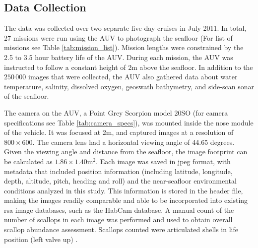 \subsection{Data Collection}

The data was collected over two separate five-day cruises in July 2011.   
In total, 27 missions were run using the AUV to photograph the seafloor (For list of missions see Table \ref{tab:mission_list}).  
Mission lengths were constrained by the 2.5 to 3.5 hour battery life of the AUV.  
During each mission, the AUV was instructed to follow a constant height of 2\;m
above the seafloor.  In addition to the $250\,000$ images that were collected, the 
AUV also gathered data about water temperature, salinity, dissolved oxygen, 
geoswath bathymetry, and side-scan sonar of the seafloor.

The camera on the AUV, a Point Grey Scorpion model 20SO (for camera specifications see Table \ref{tab:camera_specs}), 
was mounted inside the nose module of the vehicle.
It was focused at 2\;m, and captured
images at a resolution of $800\times600$.  The camera lens had a horizontal viewing 
angle of 44.65 degrees.  Given the viewing angle and distance from the seafloor, 
the image footprint can be calculated as $1.86\times1.40$\;m$^2$.
Each image was saved in jpeg format, with metadata that included position information 
(including latitude, longitude, depth, altitude, pitch, heading and roll)  
and the near-seafloor environmental conditions analyzed in this study.  
This information is stored in the header file, making the images readily comparable and 
able to be incorporated into existing \gls{rsa} image databases, such as the 
HabCam database.
A manual count of the number of scallops in each image was performed and used to obtain overall scallop
abundance assessment.
Scallops counted were articulated shells in life position (left valve up) \cite{walker}.
%
